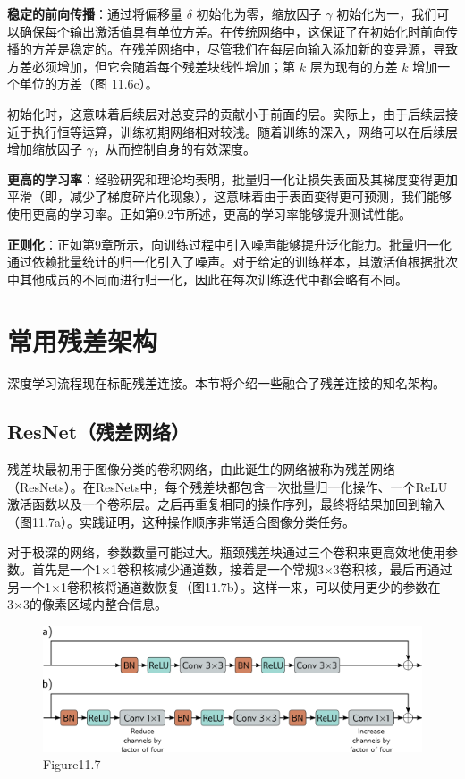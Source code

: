 \textbf{稳定的前向传播}：通过将偏移量 \(\delta\) 初始化为零，缩放因子 \(\gamma\) 初始化为一，我们可以确保每个输出激活值具有单位方差。在传统网络中，这保证了在初始化时前向传播的方差是稳定的。在残差网络中，尽管我们在每层向输入添加新的变异源，导致方差必须增加，但它会随着每个残差块线性增加；第 \(k\) 层为现有的方差 \(k\) 增加一个单位的方差（图 11.6c）。

初始化时，这意味着后续层对总变异的贡献小于前面的层。实际上，由于后续层接近于执行恒等运算，训练初期网络相对较浅。随着训练的深入，网络可以在后续层增加缩放因子 \(\gamma\)，从而控制自身的有效深度。

\textbf{更高的学习率}：经验研究和理论均表明，批量归一化让损失表面及其梯度变得更加平滑（即，减少了梯度碎片化现象），这意味着由于表面变得更可预测，我们能够使用更高的学习率。正如第9.2节所述，更高的学习率能够提升测试性能。

\textbf{正则化}：正如第9章所示，向训练过程中引入噪声能够提升泛化能力。批量归一化通过依赖批量统计的归一化引入了噪声。对于给定的训练样本，其激活值根据批次中其他成员的不同而进行归一化，因此在每次训练迭代中都会略有不同。

\section{常用残差架构}
深度学习流程现在标配残差连接。本节将介绍一些融合了残差连接的知名架构。

\subsection{ResNet（残差网络）}
残差块最初用于图像分类的卷积网络，由此诞生的网络被称为残差网络（ResNets）。在ResNets中，每个残差块都包含一次批量归一化操作、一个ReLU激活函数以及一个卷积层。之后再重复相同的操作序列，最终将结果加回到输入（图11.7a）。实践证明，这种操作顺序非常适合图像分类任务。

对于极深的网络，参数数量可能过大。瓶颈残差块通过三个卷积来更高效地使用参数。首先是一个1×1卷积核减少通道数，接着是一个常规3×3卷积核，最后再通过另一个1×1卷积核将通道数恢复（图11.7b）。这样一来，可以使用更少的参数在3×3的像素区域内整合信息。

\begin{figure}[h!]
\centering
\includegraphics[width=0.7\linewidth]{png/chapter11/ResidualResNet1.png}
\caption{Figure11.7}
\end{figure}

